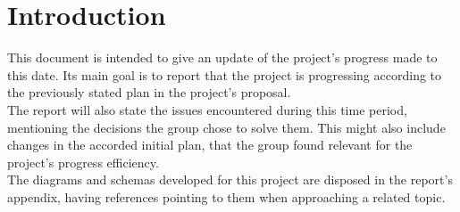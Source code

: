 %
%

\chapter{Introduction}

This document is intended to give an update of the project's progress made to this date. 
Its main goal is to report that the project is progressing according to the previously stated plan 
in the project's proposal.\\

The report will also state the issues encountered during this time period, mentioning the 
decisions the group chose to solve them. This might also include changes in the accorded
initial plan, that the group found relevant for the project's progress efficiency.\\

The diagrams and schemas developed for this project are disposed in the report's appendix,
having references pointing to them when approaching a related topic.